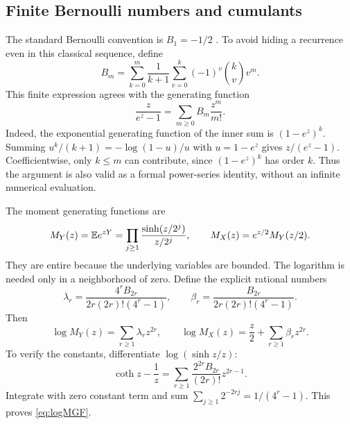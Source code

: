 \documentclass[11pt,oneside]{article}
\theoremstyle{definition}\newtheorem{definition}[theorem]{Definition}
\theoremstyle{remark}\newtheorem{remark}[theorem]{Remark}
\begin{document}
\subsection{Finite Bernoulli numbers and cumulants}
The standard Bernoulli convention is $B_1=-1/2$ \cite{dlmfBernoulli}.
To avoid hiding a recurrence even in this classical sequence, define
\begin{equation}
 B_m=\sum_{k=0}^m\frac{1}{k+1}
          \sum_{v=0}^k(-1)^v\binom kv v^m.
 \label{eq:Bernoullifinite}
\end{equation}
This finite expression agrees with the generating function
\begin{equation}
 \frac{z}{e^z-1}=\sum_{m\ge0}B_m\frac{z^m}{m!}.
 \label{eq:BernoulliGF}
\end{equation}
Indeed, the exponential generating function of the inner sum is
$(1-e^z)^k$. Summing $u^k/(k+1)=-\log(1-u)/u$ with $u=1-e^z$ gives
$z/(e^z-1)$. Coefficientwise, only $k\le m$ can contribute, since
$(1-e^z)^k$ has order $k$. Thus the argument is also valid as a formal
power-series identity, without an infinite numerical evaluation.

The moment generating functions are
\begin{equation}
 M_Y(z)=\mathbb E e^{zY}=\prod_{j\ge1}\frac{\sinh(z/2^j)}{z/2^j},
 \qquad M_X(z)=e^{z/2}M_Y(z/2).
 \label{eq:MGF}
\end{equation}
They are entire because the underlying variables are bounded. The logarithm
is needed only in a neighborhood of zero. Define the explicit rational numbers
\begin{equation}
 \lambda_r=\frac{4^r B_{2r}}{2r(2r)!(4^r-1)},\qquad
 \beta_r=\frac{B_{2r}}{2r(2r)!(4^r-1)}.
 \label{eq:lambdabeta}
\end{equation}
Then
\begin{equation}
 \log M_Y(z)=\sum_{r\ge1}\lambda_r z^{2r},
 \qquad
 \log M_X(z)=\frac z2+\sum_{r\ge1}\beta_r z^{2r}.
 \label{eq:logMGF}
\end{equation}
To verify the constants, differentiate $\log(\sinh z/z)$:
\[
 \coth z-\frac1z
 =\sum_{r\ge1}\frac{2^{2r}B_{2r}}{(2r)!}z^{2r-1}.
\]
Integrate with zero constant term and sum
$\sum_{j\ge1}2^{-2rj}=1/(4^r-1)$. This proves \eqref{eq:logMGF}.
\end{document}
